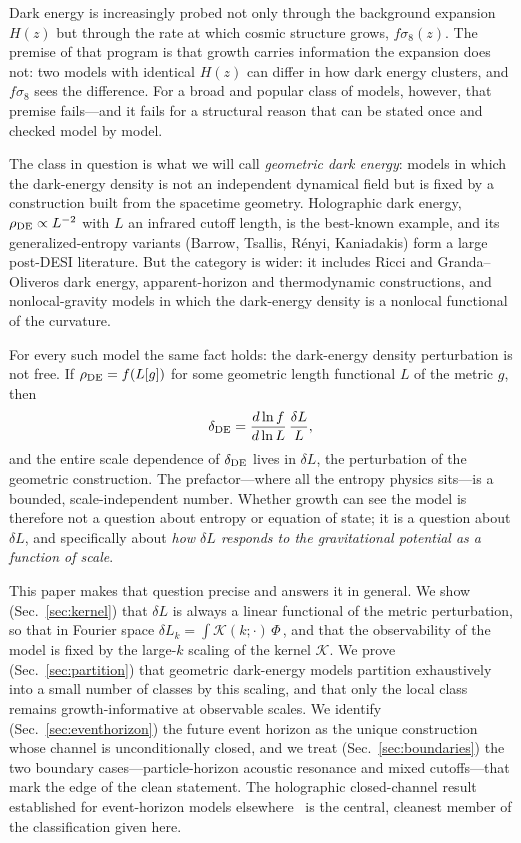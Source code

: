 \documentclass[twocolumn,10pt]{article}
\newcommand{\dDE}{\delta_{\rm DE}}
\begin{document}
Dark energy is increasingly probed not only through the background expansion
$H(z)$ but through the rate at which cosmic structure grows, $f\sigma_8(z)$.
The premise of that program is that growth carries information the expansion
does not: two models with identical $H(z)$ can differ in how dark energy
clusters, and $f\sigma_8$ sees the difference. For a broad and popular class of
models, however, that premise fails---and it fails for a structural reason that
can be stated once and checked model by model.

The class in question is what we will call \emph{geometric dark energy}: models
in which the dark-energy density is not an independent dynamical field but is
fixed by a construction built from the spacetime geometry. Holographic dark
energy, $\rho_{\rm DE}\propto L^{-2}$ with $L$ an infrared cutoff length, is the
best-known example, and its generalized-entropy variants (Barrow, Tsallis,
R\'enyi, Kaniadakis) form a large post-DESI literature. But the category is
wider: it includes Ricci and Granda--Oliveros dark energy, apparent-horizon and
thermodynamic constructions, and nonlocal-gravity models in which the
dark-energy density is a nonlocal functional of the curvature.

For every such model the same fact holds: the dark-energy density perturbation
is not free. If $\rho_{\rm DE}=f(L[g])$ for some geometric length functional
$L$ of the metric $g$, then
\begin{equation}
\dDE=\frac{d\ln f}{d\ln L}\,\frac{\delta L}{L},
\label{eq:inherit}
\end{equation}
and the entire scale dependence of $\dDE$ lives in $\delta L$, the perturbation
of the geometric construction. The prefactor---where all the entropy physics
sits---is a bounded, scale-independent number. Whether growth can see the model
is therefore not a question about entropy or equation of state; it is a
question about $\delta L$, and specifically about \emph{how $\delta L$ responds
to the gravitational potential as a function of scale}.

This paper makes that question precise and answers it in general. We show
(Sec.~\ref{sec:kernel}) that $\delta L$ is always a linear functional of the
metric perturbation, so that in Fourier space
$\delta L_k=\int \mathcal{K}(k;\cdot)\,\Phi\,$, and that the observability of the
model is fixed by the large-$k$ scaling of the kernel $\mathcal{K}$. We prove
(Sec.~\ref{sec:partition}) that geometric dark-energy models partition
exhaustively into a small number of classes by this scaling, and that only the
local class remains growth-informative at observable scales. We identify
(Sec.~\ref{sec:eventhorizon}) the future event horizon as the unique
construction whose channel is unconditionally closed, and we treat
(Sec.~\ref{sec:boundaries}) the two boundary cases---particle-horizon acoustic
resonance and mixed cutoffs---that mark the edge of the clean statement. The
holographic closed-channel result established for event-horizon models
elsewhere~\cite{CompanionPaper} is the central, cleanest member of the
classification given here.
\end{document}
